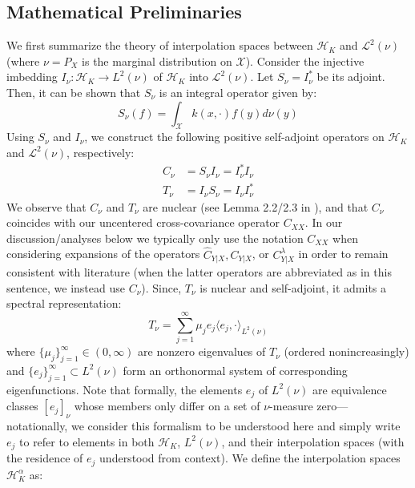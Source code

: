 \documentclass[accepted]{article}
\theoremstyle{definition}
\begin{document}
\subsection{Mathematical Preliminaries}
\label{Preliminaries}

We first summarize the theory of interpolation spaces between $\mathcal{H}_{K}$ and $\mathcal{L}^2(\nu)$ (where $\nu = P_X$ is the marginal distribution on $\mathcal{X}$). Consider the injective imbedding $I_{\nu}: \mathcal{H}_K \to L^2(\nu)$ of $\mathcal{H}_{K}$ into $\mathcal{L}^2(\nu)$. Let $S_{\nu} = I^{*}_{\nu}$ be its adjoint. Then, it can be shown that $S_{\nu}$ is an integral operator given by:
\begin{equation*}
    S_{\nu}(f) = \int_{\mathcal{X}} k(x, \cdot)f(y)d\nu(y)
\end{equation*}
Using $S_{\nu}$ and $I_{\nu}$, we construct the following positive self-adjoint operators on $\mathcal{H}_K$ and $\mathcal{L}^2(\nu)$, respectively:
\begin{align*}
    C_{\nu} & = S_{\nu}I_{\nu} =  I^{*}_{\nu}I_{\nu} \\
    T_{\nu} & = I_{\nu}S_{\nu} =  I_{\nu} I^{*}_{\nu}
\end{align*}
We observe that $C_{\nu}$ and $T_{\nu}$ are nuclear (see Lemma 2.2/2.3 in \cite{steinwart2012mercer}), and that $C_{\nu}$ coincides with our uncentered cross-covariance operator $C_{XX}$. In our discussion/analyses below we typically only use the notation $C_{XX}$ when considering expansions of the operators $\hat{C}_{Y|X}, C_{Y|X}$, or $C^{\lambda}_{Y|X}$ in order to remain consistent with literature (when the latter operators are abbreviated as in this sentence, we instead use $C_{\nu}$). Since, $T_{\nu}$ is nuclear and self-adjoint, it admits a spectral representation:
\begin{equation*}
    T_{\nu} = \sum_{j = 1}^{\infty} \mu_j e_j \langle e_j, \cdot \rangle_{L^2(\nu)}
\end{equation*}
where $\{\mu_j\}_{j = 1}^{\infty} \in (0, \infty)$ are nonzero eigenvalues of $T_{\nu}$ (ordered nonincreasingly) and $\{e_j\}_{j = 1}^{\infty} \subset L^2(\nu)$ form an orthonormal system of corresponding eigenfunctions. Note that formally, the elements $e_j$ of $L^2(\nu)$ are equivalence classes $[e_j]_{\nu}$ whose members only differ on a set of $\nu$-measure zero--- notationally, we consider this formalism to be understood here and simply write $e_j$ to refer to elements in both $\mathcal{H}_K$,  $L^2(\nu)$, and their interpolation spaces (with the residence of $e_j$ understood from context). We define the interpolation spaces $\mathcal{H}^{\alpha}_K$ as:
\end{document}
